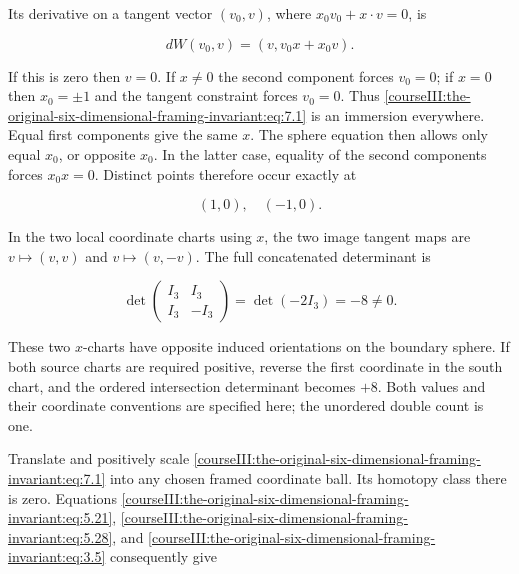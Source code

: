 Its derivative on a tangent vector \((v_0,v)\), where \(x_0v_0+x\cdot v=0\), is

\begin{equation}
dW(v_0,v)=(v,v_0x+x_0v).
 \label{courseIII:the-original-six-dimensional-framing-invariant:eq:7.2}
\end{equation}

If this is zero then \(v=0\). If \(x\ne0\) the second component forces \(v_0=0\); if \(x=0\) then \(x_0=\pm1\) and the tangent constraint forces \(v_0=0\). Thus \eqref{courseIII:the-original-six-dimensional-framing-invariant:eq:7.1} is an immersion everywhere. Equal first components give the same \(x\). The sphere equation then allows only equal \(x_0\), or opposite \(x_0\). In the latter case, equality of the second components forces \(x_0x=0\). Distinct points therefore occur exactly at

\begin{equation}
(1,0),\quad(-1,0).
 \label{courseIII:the-original-six-dimensional-framing-invariant:eq:7.3}
\end{equation}

In the two local coordinate charts using \(x\), the two image tangent maps are \(v\mapsto(v,v)\) and \(v\mapsto(v,-v)\). The full concatenated determinant is

\begin{equation}
\det\begin{pmatrix}I_3&I_3\\ I_3&-I_3\end{pmatrix}
                            =\det(-2I_3)=-8\ne0.
 \label{courseIII:the-original-six-dimensional-framing-invariant:eq:7.4}
\end{equation}

These two \(x\)-charts have opposite induced orientations on the boundary sphere. If both source charts are required positive, reverse the first coordinate in the south chart, and the ordered intersection determinant becomes \(+8\). Both values and their coordinate conventions are specified here; the unordered double count is one.

Translate and positively scale \eqref{courseIII:the-original-six-dimensional-framing-invariant:eq:7.1} into any chosen framed coordinate ball. Its homotopy class there is zero. Equations \eqref{courseIII:the-original-six-dimensional-framing-invariant:eq:5.21}, \eqref{courseIII:the-original-six-dimensional-framing-invariant:eq:5.28}, and \eqref{courseIII:the-original-six-dimensional-framing-invariant:eq:3.5} consequently give


